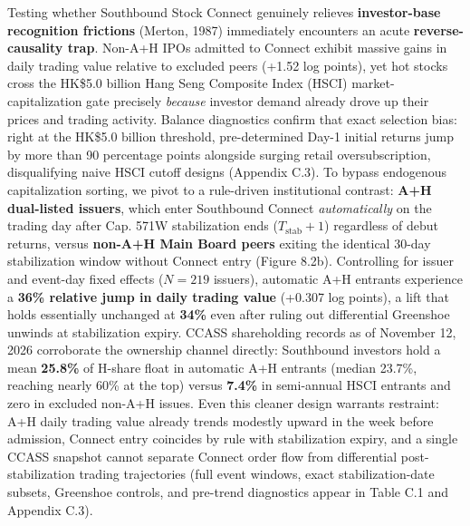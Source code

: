 \documentclass[11pt,letterpaper]{article}
\begin{document}
Testing whether Southbound Stock Connect genuinely relieves \textbf{investor-base recognition frictions} (Merton, 1987) immediately encounters an acute \textbf{reverse-causality trap}. Non-A+H IPOs admitted to Connect exhibit massive gains in daily trading value relative to excluded peers (+1.52 log points), yet hot stocks cross the HK\$5.0 billion Hang Seng Composite Index (HSCI) market-capitalization gate precisely \textit{because} investor demand already drove up their prices and trading activity. Balance diagnostics confirm that exact selection bias: right at the HK\$5.0 billion threshold, pre-determined Day-1 initial returns jump by more than 90 percentage points alongside surging retail oversubscription, disqualifying naive HSCI cutoff designs (Appendix C.3). To bypass endogenous capitalization sorting, we pivot to a rule-driven institutional contrast: \textbf{A+H dual-listed issuers}, which enter Southbound Connect \textit{automatically} on the trading day after Cap. 571W stabilization ends ($T_{\text{stab}}+1$) regardless of debut returns, versus \textbf{non-A+H Main Board peers} exiting the identical 30-day stabilization window without Connect entry (Figure 8.2b). Controlling for issuer and event-day fixed effects ($N = 219$ issuers), automatic A+H entrants experience a \textbf{36\% relative jump in daily trading value} (+0.307 log points), a lift that holds essentially unchanged at \textbf{34\%} even after ruling out differential Greenshoe unwinds at stabilization expiry. CCASS shareholding records as of November 12, 2026 corroborate the ownership channel directly: Southbound investors hold a mean \textbf{25.8\%} of H-share float in automatic A+H entrants (median 23.7\%, reaching nearly 60\% at the top) versus \textbf{7.4\%} in semi-annual HSCI entrants and zero in excluded non-A+H issues. Even this cleaner design warrants restraint: A+H daily trading value already trends modestly upward in the week before admission, Connect entry coincides by rule with stabilization expiry, and a single CCASS snapshot cannot separate Connect order flow from differential post-stabilization trading trajectories (full event windows, exact stabilization-date subsets, Greenshoe controls, and pre-trend diagnostics appear in Table C.1 and Appendix C.3).
\end{document}
